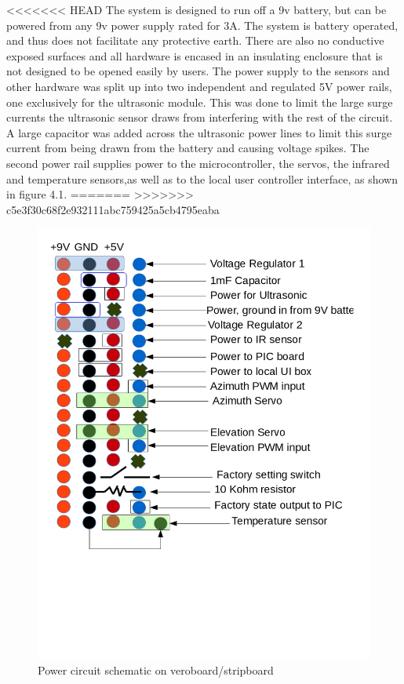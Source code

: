 \documentclass[]{report}
\begin{document}
<<<<<<< HEAD
The system is designed to run off a 9v battery, but can be powered from any 9v power supply rated for 3A. The system is battery operated, and thus does not facilitate any protective earth. There are also no conductive exposed surfaces and all hardware is encased in an insulating enclosure that is not designed to be opened easily by users. \newline
The power supply to the sensors and other hardware was split up into two independent and regulated 5V power rails, one exclusively for the ultrasonic module. This was done to limit the large surge currents the ultrasonic sensor draws from interfering with the rest of the circuit. A large capacitor was added across the ultrasonic power lines to limit this surge current from being drawn from the battery and causing voltage spikes.\newline
The second power rail supplies power to the microcontroller, the servos, the infrared and temperature sensors,as well as to the local user controller interface, as shown in figure 4.1.
=======
\label{PowerBusDiagram}
>>>>>>> c5e3f30c68f2e932111abc759425a5cb4795eaba

\begin{figure}[h]
\centering
\includegraphics[width=0.7\linewidth]{"../Diagrams/PowerCircuit"}
\caption[State Diagram]{Power circuit schematic on veroboard/stripboard}
\label{fig:PowerBusDiagram}
\end{figure}
\end{document}
